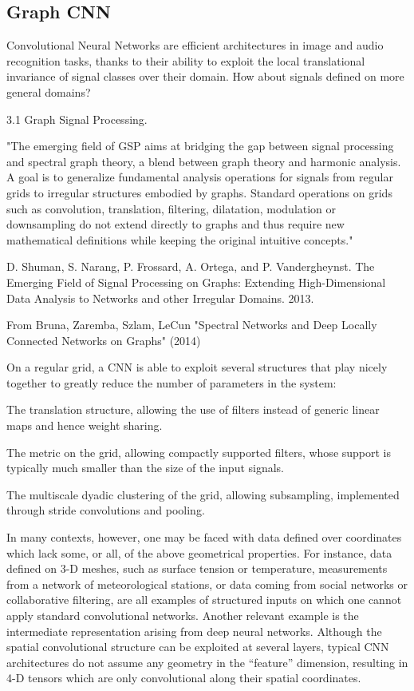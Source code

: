 \documentclass[english]{article}
\begin{document}
\subsection{Graph CNN}
%
\bitem
\item Convolutional Neural Networks are efficient architectures in image and
audio recognition tasks, thanks to their ability to exploit the local translational
invariance of signal classes over their domain. How about signals defined on more general domains?

\item 3.1 Graph Signal Processing.


"The emerging field of GSP aims at bridging the gap between signal processing and spectral graph theory, a blend between graph theory and harmonic analysis. A goal is to generalize
fundamental analysis operations for signals from regular grids to irregular structures embodied by
graphs. Standard operations on grids
such as convolution, translation, filtering, dilatation, modulation or downsampling do not extend
directly to graphs and thus require new mathematical definitions while keeping the original intuitive
concepts."

D. Shuman, S. Narang, P. Frossard, A. Ortega, and P. Vandergheynst. The Emerging Field of Signal
Processing on Graphs: Extending High-Dimensional Data Analysis to Networks and other Irregular Domains. 2013.

\item From Bruna, Zaremba, Szlam, LeCun "Spectral Networks and Deep Locally Connected Networks on Graphs" (2014)

On a regular grid, a CNN is able to exploit several structures that play nicely together to greatly
reduce the number of parameters in the system:

\bitem 
\item  The translation structure, allowing the use of filters instead of generic linear maps and
hence weight sharing.
\item  The metric on the grid, allowing compactly supported filters, whose support is typically
much smaller than the size of the input signals.
\item  The multiscale dyadic clustering of the grid, allowing subsampling, implemented through
stride convolutions and pooling.
\eitem 


In many contexts, however, one may be faced with data defined over coordinates which lack some,
or all, of the above geometrical properties. For instance, data defined on 3-D meshes, such as
surface tension or temperature, measurements from a network of meteorological stations, or data
coming from social networks or collaborative filtering, are all examples of structured inputs on which
one cannot apply standard convolutional networks. Another relevant example is the intermediate
representation arising from deep neural networks. Although the spatial convolutional structure can
be exploited at several layers, typical CNN architectures do not assume any geometry in the “feature”
dimension, resulting in 4-D tensors which are only convolutional along their spatial coordinates.
\end{document}
